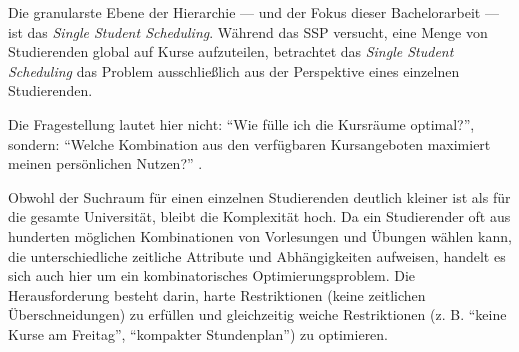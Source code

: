 Die granularste Ebene der Hierarchie --- und der Fokus dieser Bachelorarbeit --- ist das \textit{Single Student Scheduling}. Während das SSP versucht, eine Menge von Studierenden global auf Kurse aufzuteilen, betrachtet das \textit{Single Student Scheduling} das Problem ausschließlich aus der Perspektive eines einzelnen Studierenden.

Die Fragestellung lautet hier nicht: \enquote{Wie fülle ich die Kursräume optimal?}, sondern: \enquote{Welche Kombination aus den verfügbaren Kursangeboten maximiert meinen persönlichen Nutzen?} \cite{dostert-2015}.

Obwohl der Suchraum für einen einzelnen Studierenden deutlich kleiner ist als für die gesamte Universität, bleibt die Komplexität hoch. Da ein Studierender oft aus hunderten möglichen Kombinationen von Vorlesungen und Übungen wählen kann, die unterschiedliche zeitliche Attribute und Abhängigkeiten aufweisen, handelt es sich auch hier um ein kombinatorisches Optimierungsproblem. Die Herausforderung besteht darin, harte Restriktionen (keine zeitlichen Überschneidungen) zu erfüllen und gleichzeitig weiche Restriktionen (z. B. \enquote{keine Kurse am Freitag}, \enquote{kompakter Stundenplan}) zu optimieren.



